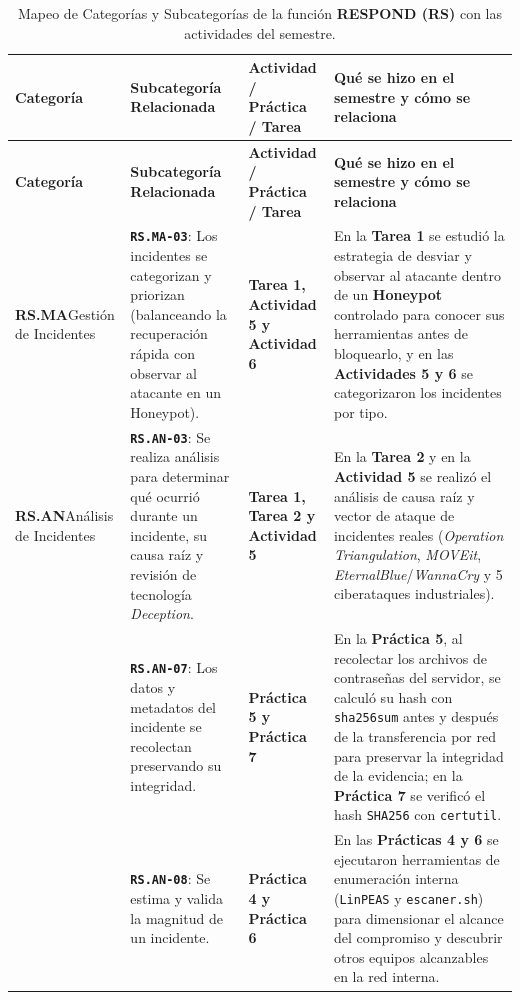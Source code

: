 \documentclass[letterpaper,11pt]{article}
\begin{document}
\begingroup
\scriptsize
\setlength{\tabcolsep}{4pt}
\renewcommand{\arraystretch}{1.24}
\begin{longtable}{|L{2.8cm}|L{4.5cm}|L{2.9cm}|L{6.5cm}|}
\caption{Mapeo de Categorías y Subcategorías de la función \textbf{RESPOND (RS)} con las actividades del semestre.}
\label{tab:mapeo-rs} \\
\hline
{}
\textbf{Categoría} & \textbf{Subcategoría Relacionada} & \textbf{Actividad / Práctica / Tarea} & \textbf{Qué se hizo en el semestre y cómo se relaciona} \\
\hline
\endfirsthead
\hline
{}
\textbf{Categoría} & \textbf{Subcategoría Relacionada} & \textbf{Actividad / Práctica / Tarea} & \textbf{Qué se hizo en el semestre y cómo se relaciona} \\
\hline
\endhead
\hline
\endfoot

\textbf{RS.MA}\newline Gestión de Incidentes &
\textbf{\texttt{RS.MA-03}}: Los incidentes se categorizan y priorizan (balanceando la recuperación rápida con observar al atacante en un Honeypot). &
\textbf{Tarea 1, Actividad 5 y Actividad 6} &
En la \textbf{Tarea 1} se estudió la estrategia de desviar y observar al atacante dentro de un \textbf{Honeypot} controlado para conocer sus herramientas antes de bloquearlo, y en las \textbf{Actividades 5 y 6} se categorizaron los incidentes por tipo. \\
\hline

\textbf{RS.AN}\newline Análisis de Incidentes &
\textbf{\texttt{RS.AN-03}}: Se realiza análisis para determinar qué ocurrió durante un incidente, su causa raíz y revisión de tecnología \textit{Deception}. &
\textbf{Tarea 1, Tarea 2 y Actividad 5} &
En la \textbf{Tarea 2} y en la \textbf{Actividad 5} se realizó el análisis de causa raíz y vector de ataque de incidentes reales (\textit{Operation Triangulation}, \textit{MOVEit}, \textit{EternalBlue}/\textit{WannaCry} y 5 ciberataques industriales). \\
\nopagebreak
 &
\textbf{\texttt{RS.AN-07}}: Los datos y metadatos del incidente se recolectan preservando su integridad. &
\textbf{Práctica 5 y Práctica 7} &
En la \textbf{Práctica 5}, al recolectar los archivos de contraseñas del servidor, se calculó su hash con \texttt{sha256sum} antes y después de la transferencia por red para preservar la integridad de la evidencia; en la \textbf{Práctica 7} se verificó el hash \texttt{SHA256} con \texttt{certutil}. \\
\nopagebreak
 &
\textbf{\texttt{RS.AN-08}}: Se estima y valida la magnitud de un incidente. &
\textbf{Práctica 4 y Práctica 6} &
En las \textbf{Prácticas 4 y 6} se ejecutaron herramientas de enumeración interna (\texttt{LinPEAS} y \texttt{escaner.sh}) para dimensionar el alcance del compromiso y descubrir otros equipos alcanzables en la red interna. \\
\hline


\end{longtable}
\end{document}
